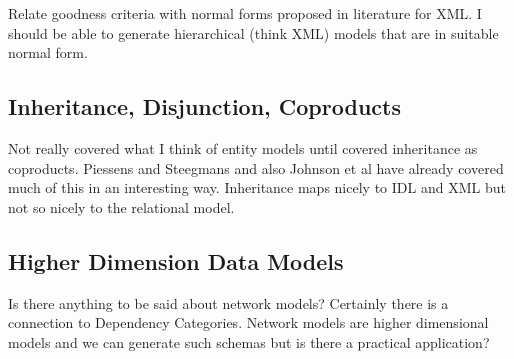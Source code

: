 Relate goodness criteria with  normal forms proposed in literature for XML. I should be able to generate hierarchical
(think XML) models that are in suitable normal form.

\subsection{Inheritance, Disjunction, Coproducts}
Not really covered what I think of entity models until covered inheritance as coproducts.
Piessens and Steegmans and also Johnson et al have already covered much of this in an interesting way. 
Inheritance maps nicely to IDL and XML but not so nicely to the relational model.  

\subsection{Higher Dimension Data Models}
Is there anything to be said about network models? Certainly there is a connection to Dependency Categories.
Network models are higher dimensional models and we can generate such schemas but is there a practical application?  
 
